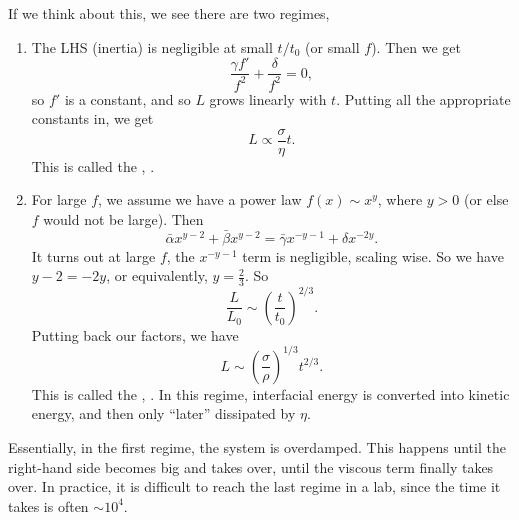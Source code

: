 \documentclass[a4paper]{article}
\begin{document}
If we think about this, we see there are two regimes,
\begin{enumerate}
  \item The LHS (inertia) is negligible at small $t/t_0$ (or small $f$). Then we get
    \[
      \frac{\gamma f'}{f^2} + \frac{\delta}{f^2} = 0,
    \]
    so $f'$ is a constant, and so $L$ grows linearly with $t$. Putting all the appropriate constants in, we get
    \[
      L \propto \frac{\sigma}{\eta} t.
    \]
    This is called the , .

  \item For large $f$, we assume we have a power law $f(x) \sim x^y$, where $y > 0$ (or else $f$ would not be large). Then
    \[
      \bar{\alpha} x^{y - 2} + \bar{\beta} x^{y - 2} = \bar{\gamma} x^{-y - 1} + \delta x^{-2y}.
    \]
    It turns out at large $f$, the $x^{-y - 1}$ term is negligible, scaling wise. So we have $y - 2 = -2y$, or equivalently, $y = \frac{2}{3}$. So
    \[
      \frac{L}{L_0} \sim \left(\frac{t}{t_0}\right)^{2/3}.
    \]
    Putting back our factors, we have
    \[
      L \sim \left(\frac{\sigma}{\rho}\right)^{1/3} t^{2/3}.
    \]
    This is called the , . In this regime, interfacial energy is converted into kinetic energy, and then only ``later'' dissipated by $\eta$.
\end{enumerate}
Essentially, in the first regime, the system is overdamped. This happens until the right-hand side becomes big and takes over, until the viscous term finally takes over. In practice, it is difficult to reach the last regime in a lab, since the time it takes is often $\sim 10^4$.

%
%
\end{document}
